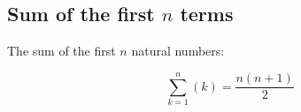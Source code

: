\subsection{Sum of the first $n$ terms}

The sum of the first $n$ natural numbers:

\[
\sum_{k = 1}^{n} (k) = \frac{n(n+1)}{2}
\]